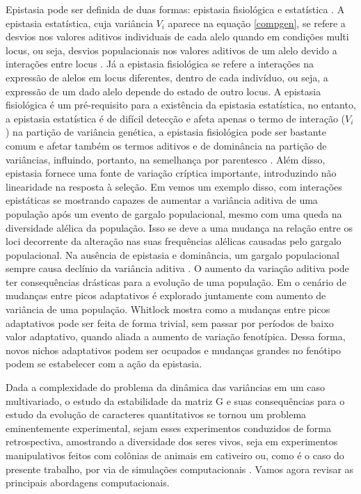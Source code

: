 Epistasia pode ser definida de duas formas: epistasia fisiológica e
estatística \citep{Cheverud1995}.
A epistasia estatística, cuja variância $V_i$ aparece na equação
\ref{compgen}, se refere a desvios nos valores aditivos individuais de
cada alelo quando em condições multi locus, ou seja, desvios
populacionais nos valores aditivos de um alelo devido a interações entre locus
\citep{Falconer1996}.
Já a epistasia fisiológica se refere a interações na expressão de alelos
em locus diferentes, dentro de cada indivíduo, ou seja, a expressão de
um dado alelo depende do estado de outro locus.
A epistasia fisiológica é um pré-requisito para a existência da
epistasia estatística, no entanto, a epistasia estatística é de difícil
detecção e afeta apenas o termo de interação ($V_i$) na partição de
variância genética, a epistasia fisiológica pode ser bastante comum e
afetar também os termos aditivos e de dominância na partição de
variâncias, influindo, portanto, na semelhança por parentesco
\citep{Crow1970, Falconer1996, Cheverud1995, Cheverud1996a}.
Além disso, epistasia fornece uma fonte de variação críptica importante,
introduzindo não linearidade na resposta à seleção.
Em \cite{Cheverud1996a} vemos um exemplo disso, com interações
epistáticas se mostrando capazes de aumentar a variância aditiva de uma
população após um evento de gargalo populacional, mesmo com uma queda na
diversidade alélica da população.
Isso se deve a uma mudança na relação entre os loci decorrente da
alteração nas suas frequências alélicas causadas pelo gargalo
populacional.
Na ausência de epistasia e dominância, um gargalo populacional sempre
causa declínio da variância aditiva \citep{Falconer1996}.
O aumento da variação aditiva pode ter consequências drásticas para a
evolução de uma população.
Em \cite{Whitlock1995} o cenário de mudanças entre picos adaptativos é
explorado juntamente com aumento de variância de uma população. 
Whitlock mostra como a mudanças entre picos adaptativos pode ser
feita de forma trivial, sem passar por períodos de baixo valor
adaptativo, quando aliada a aumento de variação fenotípica. 
Dessa forma, novos nichos adaptativos podem ser ocupados e mudanças
grandes no fenótipo podem se estabelecer com a ação da epistasia.

Dada a complexidade do problema da dinâmica das variâncias em um caso
multivariado, o estudo da estabilidade da matriz G e suas consequências
para o estudo da evolução de caracteres quantitativos se tornou um
problema eminentemente experimental, sejam esses experimentos conduzidos
de forma retrospectiva, amostrando a diversidade dos seres vivos, seja
em experimentos manipulativos feitos com colônias de animais em
cativeiro ou, como é o caso do presente trabalho, por via de simulações
computacionais \citep[para uma revisão sobre estabilidade da matriz G
veja][]{Arnold2008}.
Vamos agora revisar as principais abordagens computacionais.

